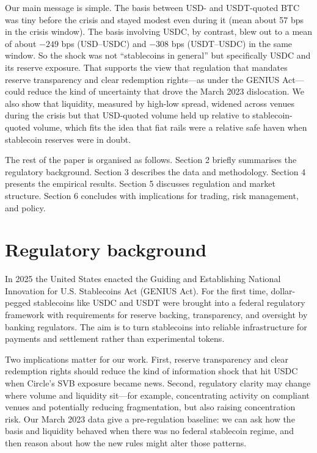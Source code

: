 \documentclass[12pt,oneside,a4paper]{article}
\begin{document}
Our main message is simple. The basis between USD- and USDT-quoted BTC was tiny before the crisis and stayed modest even during it (mean about 57 bps in the crisis window). The basis involving USDC, by contrast, blew out to a mean of about $-249$ bps (USD--USDC) and $-308$ bps (USDT--USDC) in the same window. So the shock was not ``stablecoins in general'' but specifically USDC and its reserve exposure. That supports the view that regulation that mandates reserve transparency and clear redemption rights---as under the GENIUS Act---could reduce the kind of uncertainty that drove the March 2023 dislocation. We also show that liquidity, measured by high-low spread, widened across venues during the crisis but that USD-quoted volume held up relative to stablecoin-quoted volume, which fits the idea that fiat rails were a relative safe haven when stablecoin reserves were in doubt.

The rest of the paper is organised as follows. Section 2 briefly summarises the regulatory background. Section 3 describes the data and methodology. Section 4 presents the empirical results. Section 5 discusses regulation and market structure. Section 6 concludes with implications for trading, risk management, and policy.

\section{Regulatory background}

In 2025 the United States enacted the Guiding and Establishing National Innovation for U.S. Stablecoins Act (GENIUS Act). For the first time, dollar-pegged stablecoins like USDC and USDT were brought into a federal regulatory framework with requirements for reserve backing, transparency, and oversight by banking regulators. The aim is to turn stablecoins into reliable infrastructure for payments and settlement rather than experimental tokens.

Two implications matter for our work. First, reserve transparency and clear redemption rights should reduce the kind of information shock that hit USDC when Circle's SVB exposure became news. Second, regulatory clarity may change where volume and liquidity sit---for example, concentrating activity on compliant venues and potentially reducing fragmentation, but also raising concentration risk. Our March 2023 data give a pre-regulation baseline: we can ask how the basis and liquidity behaved when there was no federal stablecoin regime, and then reason about how the new rules might alter those patterns.
\end{document}
